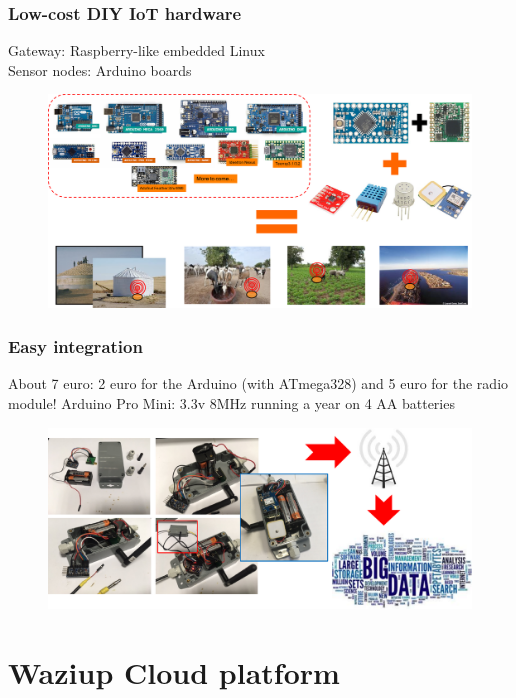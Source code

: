 \documentclass{beamer}
\begin{document}
\begin{frame}
\frametitle{Low-cost DIY IoT hardware}

Gateway: Raspberry-like embedded Linux \\
Sensor nodes: Arduino boards




  \begin{figure}[H]  
  \centering  
  \includegraphics[width=.9\linewidth]{figures/generic-iot}   
  \label{figure-generic-iot}  
  \end{figure} 

\end{frame}

\begin{frame}
\frametitle{Easy integration}

About 7 euro: 2 euro for the Arduino (with ATmega328) and 5 euro for the radio module!
Arduino Pro Mini: 3.3v 8MHz running a year on 4 AA batteries
  \begin{figure}[H] 
  \centering  
  \includegraphics[width=.9\linewidth]{figures/easy-integration}   
  \label{figure-easy-integration}  
  \end{figure} 

\end{frame}

\section{Waziup Cloud platform}
\end{document}
